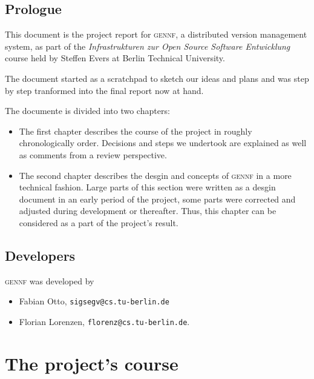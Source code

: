 \documentclass[fleqn, 10pt, a4paper]{report} \usepackage{amssymb}
\newcommand{\GENNF}{\textsc{gennf}}
\begin{document}


\tableofcontents
\newpage


\section*{Prologue}

This document is the project report for \GENNF{}, a distributed version
management system, as part of the \emph{Infrastrukturen zur Open Source
  Software Entwicklung} course held by Steffen Evers at Berlin
Technical University.

The document started as a scratchpad to sketch our ideas and plans
and was step by step tranformed into the final report now at hand.

The documente is divided into two chapters:

\begin{itemize}
\item The first chapter describes the course of the project in roughly
  chronologically order. Decisions and steps we undertook are
  explained as well as comments from a review perspective.
\item The second chapter describes the desgin and concepts of \GENNF{}
  in a more technical fashion. Large parts of this section were
  written as a desgin document in an early period of the project, some
  parts were corrected and adjusted during development or thereafter.
  Thus, this chapter can be considered as a part of the project's
  result.
\end{itemize}


\section*{Developers}

\GENNF{} was developed by
\begin{itemize}
\item Fabian Otto, \texttt{sigsegv@cs.tu-berlin.de}
\item Florian Lorenzen, \texttt{florenz@cs.tu-berlin.de}.
\end{itemize}


\chapter{The project's course \label{course}}
\end{document}
